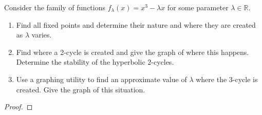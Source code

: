 \begin{problem}{3}
  Consider the family of functions $f_\lambda(x) = x^3 - \lambda x$ for some parameter
  $\lambda \in \mathbb{R}$.

  \begin{enumerate}
    \item Find all fixed points and determine their nature and where they
      are created as $\lambda$ varies.
    \item Find where a 2-cycle is created
      and give the graph of where this happens. Determine the stability of the
      hyperbolic 2-cycles.
    \item Use a graphing utility to find an approximate
      value of $\lambda$ where the 3-cycle is created. Give the graph of this situation.
  \end{enumerate}
\end{problem}

\begin{proof}
\end{proof}
\newpage
